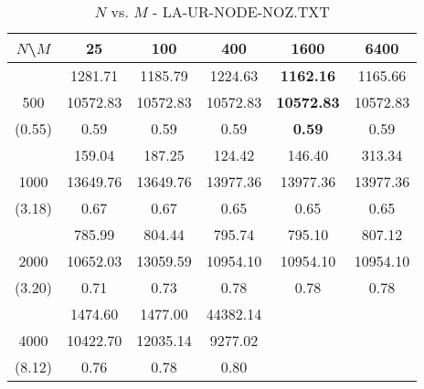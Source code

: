 \documentclass[conference]{IEEEtran}
\begin{document}
\begin{table}[th]
\caption{$N$ vs. $M$ - LA-UR-NODE-NOZ.TXT}
\label{tab:LA-UR-06-1446-MX16-NODE-NOZ.TXT}
\centering
\begin{tabular}{|c||c|c|c|c|c|}
\hline
$N$\textbackslash $M$ & 25 & 100 & 400 & 1600 & 6400 \\ \hline \hline
  & 1281.71 & 1185.79 & 1224.63 & {\bf 1162.16} & 1165.66\\ 
500  & 10572.83 & 10572.83 & 10572.83 & {\bf 10572.83} & 10572.83\\ 
(0.55)  & 0.59 & 0.59 & 0.59 & {\bf 0.59} & 0.59\\ \hline 
  & 159.04 & 187.25 & 124.42 & 146.40 & 313.34\\ 
1000  & 13649.76 & 13649.76 & 13977.36 & 13977.36 & 13977.36\\ 
(3.18)  & 0.67 & 0.67 & 0.65 & 0.65 & 0.65\\ \hline 
  & 785.99 & 804.44 & 795.74 & 795.10 & 807.12\\ 
2000  & 10652.03 & 13059.59 & 10954.10 & 10954.10 & 10954.10\\ 
(3.20)  & 0.71 & 0.73 & 0.78 & 0.78 & 0.78\\ \hline 
  & 1474.60 & 1477.00 & 44382.14 &  & \\ 
4000  & 10422.70 & 12035.14 & 9277.02 &  & \\ 
(8.12)  & 0.76 & 0.78 & 0.80 &  & \\ \hline 
\end{tabular}
\end{table}
\end{document}

